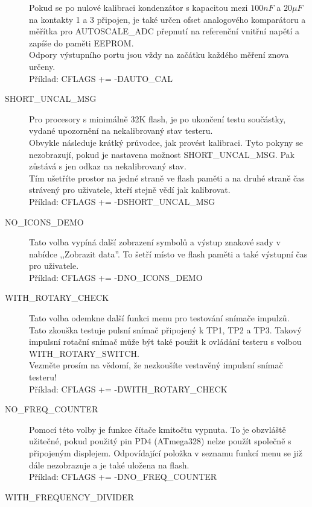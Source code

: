 \begin{description}
Pokud se po nulové kalibraci kondenzátor s kapacitou mezi \(100nF\) a \(20\mu F\)  na kontakty 1 a 3 
připojen, je také určen ofset analogového komparátoru a měřítka pro AUTOSCALE\_ADC přepnutí na referenční vnitřní napětí a zapíše do paměti EEPROM.\\
Odpory výstupního portu jsou vždy na začátku každého měření znova určeny.\\
Příklad: CFLAGS += -DAUTO\_CAL
\vspace{-0,3cm}
  \item[SHORT\_UNCAL\_MSG] Pro procesory s minimálně 32K flash, je po ukončení testu součástky, vydané
upozornění na nekalibrovaný stav testeru.\\ Obvykle následuje krátký průvodce, jak provést kalibraci.
Tyto pokyny se nezobrazují, pokud je nastavena možnost SHORT\_UNCAL\_MSG.
Pak zůstává s jen odkaz na nekalibrovaný stav.\\
Tím ušetříte prostor na jedné straně ve flash paměti a na druhé straně čas strávený pro uživatele,
kteří stejně vědí jak kalibrovat.\\
Příklad: CFLAGS += -DSHORT\_UNCAL\_MSG
\vspace{-0,3cm}
 \item[NO\_ICONS\_DEMO]
Tato volba vypíná další zobrazení symbolů a výstup znakové sady v nabídce
,,Zobrazit data''.
To šetří místo ve flash paměti a také výstupní čas pro uživatele.\\
Příklad: CFLAGS += -DNO\_ICONS\_DEMO
\vspace{-0,3cm}
 \item[WITH\_ROTARY\_CHECK]
Tato volba odemkne další funkci menu pro testování snímače impulzů.
Tato zkouška testuje pulsní snímač připojený k TP1, TP2 a TP3.
Takový impulsní rotační snímač může být také použit k ovládání testeru s volbou WITH\_ROTARY\_SWITCH.\\
Vezměte prosím na vědomí, že nezkoušíte vestavěný impulsní snímač testeru!\\
Příklad: CFLAGS += -DWITH\_ROTARY\_CHECK
\vspace{-0,3cm}
 \item[NO\_FREQ\_COUNTER]
Pomocí této volby je funkce čítače kmitočtu vypnuta.
To je obzvláště užitečné, pokud použitý pin PD4 (ATmega328) nelze použít společně s
připojeným displejem.
Odpovídající položka v seznamu funkcí menu se již dále nezobrazuje a je také uložena na flash.\\
Příklad: CFLAGS += -DNO\_FREQ\_COUNTER
\vspace{-0,3cm}
 \item[WITH\_FREQUENCY\_DIVIDER]

\end{description}
